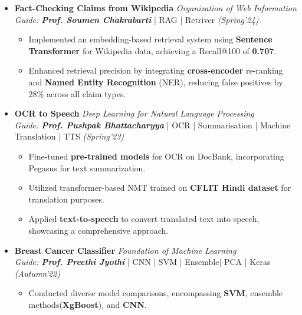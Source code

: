 \documentclass[a4paper,10.5pt]{article}
\begin{document}
\begin{itemize}[noitemsep,nolistsep]
\item \textbf{Fact-Checking Claims from Wikipedia}  \hfill {\emph{Organization of Web Information}}\\
\emph{Guide: \textbf{Prof. Soumen Chakrabarti}} | RAG | Retriver \hfill
\emph{(Spring'24)}
\vspace{0.1cm}
\begin{itemize}[noitemsep,nolistsep]
    \item Implemented an embedding-based retrieval system using \textbf{Sentence Transformer} for Wikipedia data, achieving a Recall@100 of \textbf{0.707}.
    \vspace{0.07cm}
    \item Enhanced retrieval precision by integrating \textbf{cross-encoder} re-ranking and \textbf{Named Entity Recognition} (NER), reducing false positives by 28\% across all claim types.
\end{itemize}
\vspace{0.2cm}

\item \textbf{OCR to Speech} \hfill {\emph{Deep Learning for Natural Language Processing}}\\
\emph{Guide: \textbf{Prof. Pushpak Bhattacharyya}} | OCR | Summarisation | Machine Translation | TTS \hfill
\emph{(Spring'23)}
\begin{itemize}[noitemsep,nolistsep]
\vspace{0.1cm}
    \item Fine-tuned \textbf{pre-trained models} for OCR on DocBank, incorporating Pegasus for text summarization.
    \vspace{0.07cm}
    
    \item  Utilized transformer-based NMT trained on \textbf{CFLIT Hindi dataset} for translation purposes.
    \vspace{0.07cm}
    
    \item Applied \textbf{text-to-speech} to convert translated text into speech, showcasing a comprehensive approach.
\end{itemize}
\vspace{0.2cm}

\item \textbf{Breast Cancer Classifier} \hfill {\emph{Foundation of Machine Learning}}\\
\emph{Guide: \textbf{Prof. Preethi Jyothi}} | CNN | SVM | Ensemble| PCA | Keras \hfill
\emph{(Autumn'22)}
\begin{itemize}[noitemsep,nolistsep]
\vspace{0.1cm}
    \item Conducted diverse model comparisons, encompassing \textbf{SVM}, ensemble methods(\textbf{XgBoost}), and \textbf{CNN}.
    \vspace{0.07cm}
    

\end{itemize}
\end{itemize}
\end{document}
